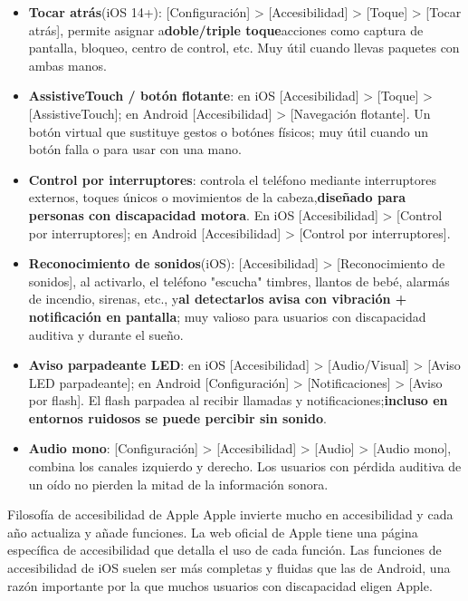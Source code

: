 \begin{itemize}
  \item \textbf{Tocar atrás}(iOS 14+): [Configuración] > [Accesibilidad] > [Toque] > [Tocar atrás], permite asignar a\textbf{doble/triple toque}acciones como captura de pantalla, bloqueo, centro de control, etc. Muy útil cuando llevas paquetes con ambas manos.
  \item \textbf{AssistiveTouch / botón flotante}: en iOS [Accesibilidad] > [Toque] > [AssistiveTouch]; en Android [Accesibilidad] > [Navegación flotante]. Un botón virtual que sustituye gestos o botónes físicos; muy útil cuando un botón falla o para usar con una mano.
  \item \textbf{Control por interruptores}: controla el teléfono mediante interruptores externos, toques únicos o movimientos de la cabeza,\textbf{diseñado para personas con discapacidad motora}. En iOS [Accesibilidad] > [Control por interruptores]; en Android [Accesibilidad] > [Control por interruptores].
  \item \textbf{Reconocimiento de sonidos}(iOS): [Accesibilidad] > [Reconocimiento de sonidos], al activarlo, el teléfono "escucha" timbres, llantos de bebé, alarmás de incendio, sirenas, etc., y\textbf{al detectarlos avisa con vibración + notificación en pantalla}; muy valioso para usuarios con discapacidad auditiva y durante el sueño.
  \item \textbf{Aviso parpadeante LED}: en iOS [Accesibilidad] > [Audio/Visual] > [Aviso LED parpadeante]; en Android [Configuración] > [Notificaciones] > [Aviso por flash]. El flash parpadea al recibir llamadas y notificaciones;\textbf{incluso en entornos ruidosos se puede percibir sin sonido}.
  \item \textbf{Audio mono}: [Configuración] > [Accesibilidad] > [Audio] > [Audio mono], combina los canales izquierdo y derecho. Los usuarios con pérdida auditiva de un oído no pierden la mitad de la información sonora.
\end{itemize}

\begin{tcbinfo}{Filosofía de accesibilidad de Apple}
Apple invierte mucho en accesibilidad y cada año actualiza y añade funciones. La web oficial de Apple tiene una página específica de accesibilidad que detalla el uso de cada función. Las funciones de accesibilidad de iOS suelen ser más completas y fluidas que las de Android, una razón importante por la que muchos usuarios con discapacidad eligen Apple.

\end{tcbinfo}

